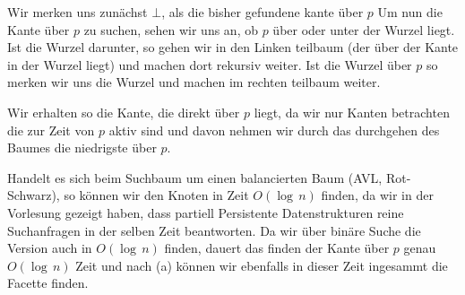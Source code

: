 \documentclass[11pt,a4paper,ngerman]{article}
\begin{document}
Wir merken uns zunächst $\bot$, als die bisher gefundene kante über $p$
Um nun die Kante über $p$ zu suchen, sehen wir uns an, ob $p$ über oder unter der Wurzel liegt. Ist die Wurzel darunter, so gehen wir in den Linken teilbaum (der über der Kante in der Wurzel liegt) und machen dort rekursiv weiter. Ist die Wurzel über $p$ so merken wir uns die Wurzel und machen im rechten teilbaum weiter.

Wir erhalten so die Kante, die direkt über $p$ liegt, da wir nur Kanten betrachten die zur Zeit von $p$ aktiv sind und davon nehmen wir durch
das durchgehen des Baumes die niedrigste über $p$.

Handelt es sich beim Suchbaum um einen balancierten Baum (AVL, Rot-Schwarz), so können wir den Knoten in Zeit $O(\log \, n)$ finden, da wir
in der Vorlesung gezeigt haben, dass partiell Persistente Datenstrukturen reine Suchanfragen in der selben Zeit beantworten. Da wir
über binäre Suche die Version auch in $O(\log \, n)$ finden, dauert das finden der Kante über $p$ genau $O(\log \, n)$ Zeit und nach (a) können
wir ebenfalls in dieser Zeit ingesammt die Facette finden.


\label{LastPage}
\end{document}
